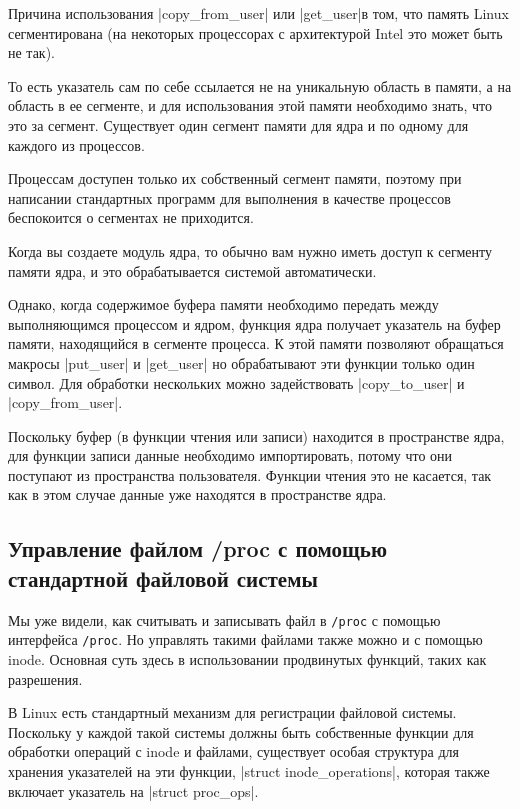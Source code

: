 \documentclass[10pt, oneside]{book}
\begin{document}
Причина использования \cpp|copy_from_user| или \cpp|get_user|в том, что память Linux сегментирована (на некоторых процессорах с архитектурой Intel это может быть не так).

То есть указатель сам по себе ссылается не на уникальную область в памяти, а на область в ее сегменте, и для использования этой памяти необходимо знать, что это за сегмент. Существует один сегмент памяти для ядра и по одному для каждого из процессов.

Процессам доступен только их собственный сегмент памяти, поэтому при написании стандартных программ для выполнения в качестве процессов беспокоится о сегментах не приходится.

Когда вы создаете модуль ядра, то обычно вам нужно иметь доступ к сегменту памяти ядра, и это обрабатывается системой автоматически.

Однако, когда содержимое буфера памяти необходимо передать между выполняющимся процессом и ядром, функция ядра получает указатель на буфер памяти, находящийся в сегменте процесса. К этой памяти позволяют обращаться макросы \cpp|put_user| и \cpp|get_user| но обрабатывают эти функции только один символ. Для обработки нескольких можно задействовать \cpp|copy_to_user| и \cpp|copy_from_user|.

Поскольку буфер (в функции чтения или записи) находится в пространстве ядра, для функции записи данные необходимо импортировать, потому что они поступают из пространства пользователя. Функции чтения это не касается, так как в этом случае данные уже находятся в пространстве ядра.


\subsection{Управление файлом /proc с помощью стандартной файловой системы}
\label{sec:manage_procfs}
Мы уже видели, как считывать и записывать файл в \verb|/proc| с помощью интерфейса \verb|/proc|.
Но управлять такими файлами также можно и с помощью inode. Основная суть здесь в использовании продвинутых функций, таких как разрешения.

В Linux есть стандартный механизм для регистрации файловой системы. Поскольку у каждой такой системы должны быть собственные функции для обработки операций с inode и файлами, существует особая структура для хранения указателей на эти функции, \cpp|struct inode_operations|, которая также включает указатель на \cpp|struct proc_ops|.
\end{document}
